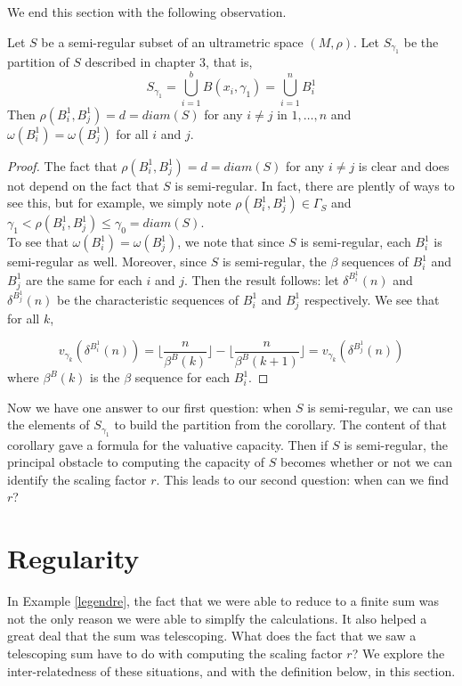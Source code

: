 We end this section with the following observation.

\begin{proposition}
	Let $S$ be a semi-regular subset of an ultrametric space $(M,\rho)$. Let $S_{\gamma_1}$ be the partition of $S$ described in chapter $3$, that is,
	\[S_{\gamma_1} = \bigcup_{i=1}^{b} B(x_i,\gamma_1) = \bigcup_{i=1}^{n} B^1_i\]
	Then $\rho(B^1_i, B^1_j) = d = diam(S)$ for any $i \neq j$ in $1,\ldots,n$ and $\omega( B^1_i) = \omega( B^1_j)$ for all $i$ and $j$.
\end{proposition}

\begin{proof}
	The fact that  $\rho(B^1_i, B^1_j) = d = diam(S)$ for any $i \neq j$ is clear and does not depend on the fact that $S$ is semi-regular. In fact, there are plently of ways to see this, but for example, we simply note $\rho(B^1_i, B^1_j) \in \Gamma_S$  and $ \gamma_1 < \rho(B^1_i, B^1_j)\leq \gamma_0 = diam(S)$.\\
	
	To see that $\omega( B^1_i) = \omega( B^1_j)$, we note that since $S$ is semi-regular, each $B^1_i$ is semi-regular as well. Moreover, since $S$ is semi-regular, the $\beta$ sequences of $B^1_i$ and $B^1_j$ are the same for each $i$ and $j$. Then the result follows: let $\delta^{B^1_i}(n)$ and $\delta^{B^1_j}(n)$ be the characteristic sequences of $B^1_i$ and $B^1_j$ respectively. We see that for all $k$,
	  
	  \[v_{\gamma_k}(\delta^{B^1_i}(n)) =  \lfloor\frac{n}{\beta^B(k)}\rfloor - \lfloor\frac{n}{\beta^B(k+1)}\rfloor =  v_{\gamma_k}(\delta^{B^1_j}(n)) \]
	where $\beta^B(k)$ is the $\beta$ sequence for each  $B^1_i$.
	 
\end{proof}

Now we have one answer to our first question: when $S$ is semi-regular, we can use the elements of $S_{\gamma_1}$ to build the partition from the corollary. The content of that corollary gave a formula for the valuative capacity. Then if $S$ is semi-regular, the principal obstacle to computing the capacity of $S$ becomes whether or not we can identify the scaling factor $r$. This leads to our second question: when can we find $r$?

\section{Regularity}
In Example \ref{legendre}, the fact that we were able to reduce to a finite sum was not the only reason we were able to simplfy the calculations. It also helped a great deal that the sum was telescoping. What does the fact that we saw a telescoping sum have to do with computing the scaling factor $r$? We explore the inter-relatedness of these situations, and with the definition below, in this section.

